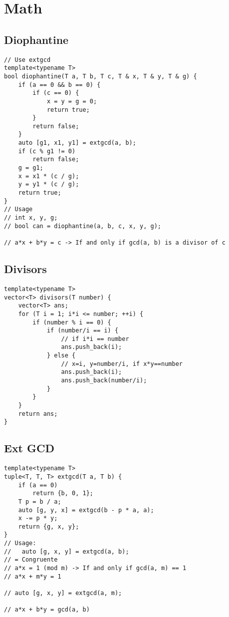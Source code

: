 \documentclass[10pt,letterpaper,twocolumn,twosided]{article}
\begin{document}
\section{Math}

\subsection{Diophantine}
\begin{lstlisting}
// Use extgcd
template<typename T>
bool diophantine(T a, T b, T c, T & x, T & y, T & g) {
    if (a == 0 && b == 0) {
        if (c == 0) {
            x = y = g = 0;
            return true;
        }
        return false;
    }
    auto [g1, x1, y1] = extgcd(a, b);
    if (c % g1 != 0)
        return false;
    g = g1;
    x = x1 * (c / g);
    y = y1 * (c / g);
    return true;
}
// Usage
// int x, y, g;
// bool can = diophantine(a, b, c, x, y, g);

// a*x + b*y = c -> If and only if gcd(a, b) is a divisor of c
\end{lstlisting}

\subsection{Divisors}
\begin{lstlisting}
template<typename T>
vector<T> divisors(T number) {
    vector<T> ans;
    for (T i = 1; i*i <= number; ++i) {
        if (number % i == 0) {
            if (number/i == i) {
                // if i*i == number
                ans.push_back(i);
            } else {
                // x=i, y=number/i, if x*y==number
                ans.push_back(i);
                ans.push_back(number/i);
            }
        }
    }
    return ans;
}
\end{lstlisting}

\subsection{Ext GCD}
\begin{lstlisting}
template<typename T>
tuple<T, T, T> extgcd(T a, T b) {
    if (a == 0)
        return {b, 0, 1};
    T p = b / a;
    auto [g, y, x] = extgcd(b - p * a, a);
    x -= p * y;
    return {g, x, y};
}
// Usage:
//   auto [g, x, y] = extgcd(a, b);
// = Congruente
// a*x = 1 (mod m) -> If and only if gcd(a, m) == 1
// a*x + m*y = 1

// auto [g, x, y] = extgcd(a, m);

// a*x + b*y = gcd(a, b) 
\end{lstlisting}
\end{document}

